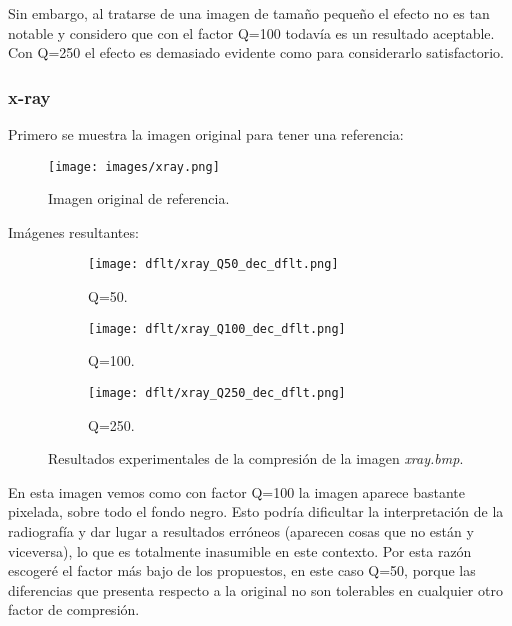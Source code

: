 \documentclass[12pt,a4paper]{article}
\begin{document}
Sin embargo, al tratarse de una imagen de tamaño pequeño el efecto no es tan notable y considero que con el factor Q=100 todavía es un resultado aceptable. Con Q=250 el efecto es demasiado evidente como para considerarlo satisfactorio.\\


\subsubsection{x-ray}
Primero se muestra la imagen original para tener una referencia:
\begin{figure}[H]
    \centering
    \texttt{[image: images/xray.png]}
    \caption[Referencia - x-ray]{Imagen original de referencia.}
    
\end{figure}
    
    \vspace{0.5cm}

Imágenes resultantes:
\begin{figure}   [H]
    \begin{subfigure}{0.30\textwidth}
        \centering
        \texttt{[image: dflt/xray\_Q50\_dec\_dflt.png]}
        \caption{Q=50.}
        
    \end{subfigure}
    \hfill
    \begin{subfigure}{0.30\textwidth}
        \centering
        \texttt{[image: dflt/xray\_Q100\_dec\_dflt.png]}
        \caption{Q=100.}
        
    \end{subfigure}
    \hfill
    \begin{subfigure}{0.30\textwidth}
        \centering
        \texttt{[image: dflt/xray\_Q250\_dec\_dflt.png]}
        \caption{Q=250.}
        
    \end{subfigure}
    
    \caption[Resultados experimentales - x-ray]{Resultados experimentales de la compresión de la imagen \textit{xray.bmp}.}
    
\end{figure}

En esta imagen vemos como con factor Q=100 la imagen aparece bastante pixelada, sobre todo el fondo negro. Esto podría  dificultar la interpretación de la radiografía y dar lugar a resultados erróneos (aparecen cosas que no están y viceversa), lo que es totalmente inasumible en este contexto. Por esta razón escogeré el factor más bajo de los propuestos, en este caso Q=50, porque las diferencias que presenta respecto a la original no son tolerables en cualquier otro factor de compresión.\\
\end{document}
